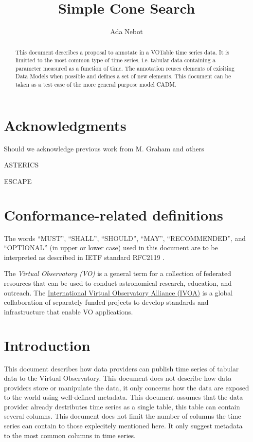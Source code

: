 \documentclass[11pt,a4paper]{ivoa}
\title{Simple Cone Search}
\author[http://www.ivoa.net/twiki/bin/view/IVOA/AdaNebot]{Ada Nebot}
\begin{document}
\begin{abstract}
  This document describes a proposal to annotate in a VOTable time series data. It is limitted to the most common type of time series, i.e. tabular data containing a parameter measured as a function of time. The annotation reuses elements of exisiting Data Models when possible and defines a set of new elements. This document can be taken as a test case of the more general purpose model CADM. 
\end{abstract}

\section*{Acknowledgments}
Should we acknowledge previous work from M. Graham and others

ASTERICS

ESCAPE

\section*{Conformance-related definitions}

The words ``MUST'', ``SHALL'', ``SHOULD'', ``MAY'', ``RECOMMENDED'', and
``OPTIONAL'' (in upper or lower case) used in this document are to be
interpreted as described in IETF standard RFC2119 \citep{std:RFC2119}.

The \emph{Virtual Observatory (VO)} is a
general term for a collection of federated resources that can be used
to conduct astronomical research, education, and outreach.
The \href{http://www.ivoa.net}{International
Virtual Observatory Alliance (IVOA)} is a global
collaboration of separately funded projects to develop standards and
infrastructure that enable VO applications.


\section{Introduction}
This document describes how data providers can publish time series of tabular data to the Virtual Observatory.
This document does not describe how data providers store or manipulate the data, it only concerns how the data are exposed to the world using well-defined metadata. 
This document assumes that the data provider already destributes time series as a single table, this table can contain several columns.
This document does not limit the number of columns the time series can contain to those explecitely mentioned here. It only suggest metadata to the most common columns in time series.  
\end{document}
